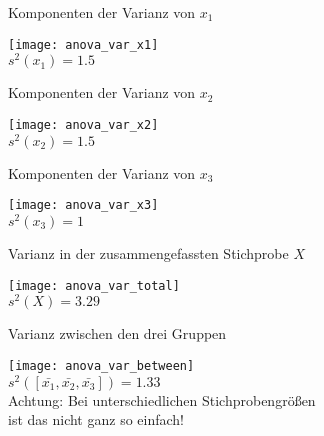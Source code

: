 \begin{frame}
  {Komponenten der Varianz von $x_1$}
  
  \begin{center}
    \texttt{[image: anova\_var\_x1]}\\
    $s^2(x_1)=1.5$
  \end{center}
\end{frame}

\begin{frame}
  {Komponenten der Varianz von $x_2$}
  
  \begin{center}
    \texttt{[image: anova\_var\_x2]}\\
    $s^2(x_2)=1.5$
  \end{center}
\end{frame}

\begin{frame}
  {Komponenten der Varianz von $x_3$}
  
  \begin{center}
    \texttt{[image: anova\_var\_x3]}\\
    $s^2(x_3)=1$
  \end{center}
\end{frame}

\begin{frame}
  {Varianz in der zusammengefassten Stichprobe $X$}
  
  \begin{center}
    \texttt{[image: anova\_var\_total]}\\
    $s^2(X)=3.29$
  \end{center}
\end{frame}

\begin{frame}
  {Varianz zwischen den drei Gruppen}
  
  \begin{center}
    \texttt{[image: anova\_var\_between]}\\
    $s^2([\bar{x_1}, \bar{x_2}, \bar{x_3}])=1.33$\\
    \vspace{0.5cm}
    Achtung: Bei unterschiedlichen Stichprobengrößen\\
    ist das nicht ganz so einfach!
  \end{center}
\end{frame}


